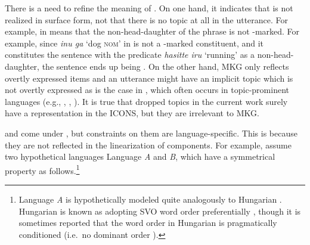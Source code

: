 There is a need to refine the meaning of .
On one hand, it indicates that  is not realized in surface form, not that
there is no topic at all in the utterance.  For example,
 in  means that the non-head-daughter of
the phrase is not \wa-marked.  For example, since \textit{inu ga} `dog
\textsc{nom}' in  is not a \wa-marked constituent,
and it constitutes the sentence with the predicate \textit{hasitte
  iru} `running' as a non-head-daughter, the sentence ends up being
. On the other hand, MKG only reflects overtly
expressed items and an utterance might have an implicit topic which is
not overtly expressed as is the case in , which often occurs
in topic-prominent languages (e.g., , , ).
It is true that dropped topics in the current work surely
have a representation in the ICONS, but they are irrelevant to MKG.



 and  come under , but
constraints on them are language-specific. This is because they are
not reflected in the linearization of components. For example, assume
two hypothetical languages Language \textit{A} and \textit{B}, which
have a symmetrical property as follows.\footnote{Language \textit{A}
  is hypothetically modeled quite analogously to Hungarian
  \citep{kiss:98,szendroi:99}. Hungarian is known as adopting SVO word
  order preferentially \citep{gell:ruhlen:11}, though it is sometimes
  reported that the word order in Hungarian is pragmatically
  conditioned (i.e.\ no dominant order \citep{kiefer:67}).}
 





